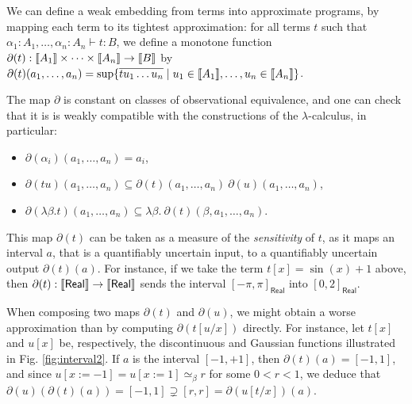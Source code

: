 We can define a weak embedding from terms into approximate programs, by mapping each term to its tightest approximation: for all terms $t$ such that $\alpha_{1}:A_{1},\dots,\alpha_{n}:A_{n}\vdash t:B$, we define a monotone function $\partial(t):\llbracket A_{1} \rrbracket\times \dots \times \llbracket A_{n} \rrbracket \to \llbracket B \rrbracket$ by $\partial(t)(a_1, \ldots, a_n) = \sup \{ \overline{t u_1 \ldots u_n} \mid u_1 \in \llbracket A_1 \rrbracket, \ldots, u_n \in \llbracket A_n \rrbracket \}$. 

\begin{remark} \label{remark:push-exp-stlc}
The map $\partial$ is constant on classes of observational equivalence, and one can check that it is is weakly compatible with the constructions of the $\lambda$-calculus, in particular:
\begin{itemize}
\item $\partial (\alpha_{i})(a_{1},\dots, a_{n})=a_{i}$,
\item $\partial (tu)(a_{1},\dots, a_{n}) \subseteq \partial (t)(a_{1},\dots, a_{n}) ~ \partial (u)(a_{1},\dots, a_{n})$,
\item $\partial (\lambda \beta. t)(a_{1},\dots, a_{n}) \subseteq \lambda \beta.~ \partial (t)(\beta, a_{1},\dots, a_{n})$.
\end{itemize}
\end{remark}

This map $\partial(t)$ can be taken as a measure of the \emph{sensitivity} of $t$, as it maps an interval $a$, that is a quantifiably uncertain input, to a quantifiably uncertain output $\partial(t)(a)$. 
For instance, if we take the term $t[x]= \sin(x)+1$ above, then $\partial(t): \llbracket \mathsf{Real} \rrbracket\to \llbracket \mathsf{Real} \rrbracket$ sends the interval $[-\pi,\pi]_{\mathsf{Real}}$ into $[0,2]_{\mathsf{Real}}$.



\begin{remark} \label{remark:oplax-functor-stlc}
When composing two maps $\partial(t)$ and $\partial(u)$, we might obtain a worse approximation than by computing $\partial(t[u/x])$ directly.
For instance, let $t[x]$ and 
$u[x]$ be, respectively, the discontinuous and Gaussian functions illustrated in Fig. \ref{fig:interval2}.  
If $a$ is the interval $[-1,+1]$, then $\partial(t)(a)=[-1,1]$, and since $u[x:=-1]=u[x:=1]\simeq_{\beta} r$ for some $0<r<1$, we deduce that $\partial(u)(\partial(t)(a))=[-1,1] \supsetneq [r,r  ]= \partial (u[t/x])(a)$.

\end{remark}










